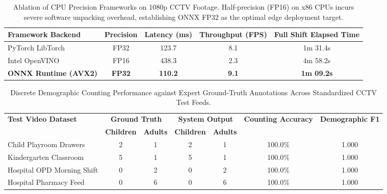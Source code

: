 \begin{table}[htbp]
\centering
\caption{Ablation of CPU Precision Frameworks on 1080p CCTV Footage. Half-precision (FP16) on x86 CPUs incurs severe software unpacking overhead, establishing ONNX FP32 as the optimal edge deployment target.}
\label{tab:precision_ablation}
\small
\begin{tabular}{lcccc}
\toprule
\textbf{Framework Backend} & \textbf{Precision} & \textbf{Latency (ms)} & \textbf{Throughput (FPS)} & \textbf{Full Shift Elapsed Time} \\
\midrule
PyTorch LibTorch & FP32 & 123.7 & 8.1 & 1m 31.4s \\
Intel OpenVINO & FP16 & 438.3 & 2.3 & 4m 58.2s \\
\textbf{ONNX Runtime (AVX2)} & \textbf{FP32} & \textbf{110.2} & \textbf{9.1} & \textbf{1m 09.2s} \\
\bottomrule
\end{tabular}
\end{table}

\begin{table}[htbp]
\centering
\caption{Discrete Demographic Counting Performance against Expert Ground-Truth Annotations Across Standardized CCTV Test Feeds.}
\label{tab:ground_truth_verification}
\small
\begin{tabular}{lcccccc}
\toprule
\textbf{Test Video Dataset} & \multicolumn{2}{c}{\textbf{Ground Truth}} & \multicolumn{2}{c}{\textbf{System Output}} & \textbf{Counting Accuracy} & \textbf{Demographic F1} \\
\cmidrule(lr){2-3} \cmidrule(lr){4-5}
 & \textbf{Children} & \textbf{Adults} & \textbf{Children} & \textbf{Adults} & & \\
\midrule
Child Playroom Drawers & 2 & 1 & 2 & 1 & 100.0\% & 1.000 \\
Kindergarten Classroom & 5 & 1 & 5 & 1 & 100.0\% & 1.000 \\
Hospital OPD Morning Shift & 0 & 2 & 0 & 2 & 100.0\% & 1.000 \\
Hospital Pharmacy Feed & 0 & 6 & 0 & 6 & 100.0\% & 1.000 \\
\bottomrule
\end{tabular}
\end{table}


